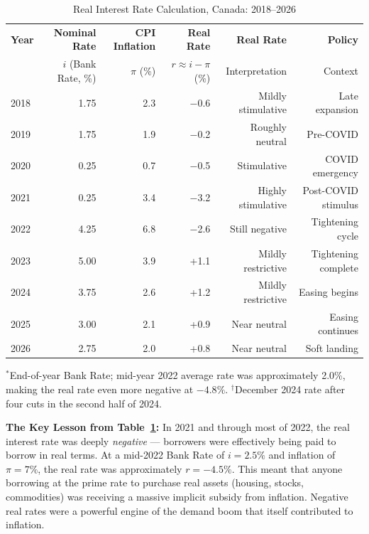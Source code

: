 \begin{table}[H]
\centering
\caption{Real Interest Rate Calculation, Canada: 2018--2026}
\label{tab:real_rates}
\renewcommand{\arraystretch}{1.30}
\begin{tabular}{lrrrrr}
\toprule
\textbf{Year} & \textbf{Nominal Rate} & \textbf{CPI Inflation} & \textbf{Real Rate}
              & \textbf{Real Rate} & \textbf{Policy} \\
              & $i$ (Bank Rate, \%) & $\pi$ (\%) & $r \approx i - \pi$ (\%)
              & Interpretation & Context \\
\midrule
2018 & 1.75 & 2.3 & $-$0.6 & Mildly stimulative & Late expansion \\
2019 & 1.75 & 1.9 & $-$0.2 & Roughly neutral    & Pre-COVID \\
2020 & 0.25 & 0.7 & $-$0.5 & Stimulative        & COVID emergency \\
2021 & 0.25 & 3.4 & $-$3.2 & Highly stimulative & Post-COVID stimulus \\
2022 & 4.25\rlap{$^*$} & 6.8 & $-$2.6\rlap{$^*$} & Still negative & Tightening cycle \\
2023 & 5.00 & 3.9 & +1.1   & Mildly restrictive & Tightening complete \\
2024 & 3.75\rlap{$^\dagger$} & 2.6 & +1.2 & Mildly restrictive & Easing begins \\
2025 & 3.00 & 2.1 & +0.9   & Near neutral       & Easing continues \\
2026 & 2.75 & 2.0 & +0.8   & Near neutral       & Soft landing \\
\bottomrule
\end{tabular}
\vspace{4pt}
\noindent\footnotesize{$^*$End-of-year Bank Rate; mid-year 2022 average rate was
approximately 2.0\%, making the real rate even more negative at $-4.8\%$.
$^\dagger$December 2024 rate after four cuts in the second half of 2024.}
\end{table}

\noindent\textbf{The Key Lesson from Table~\ref{tab:real_rates}:}
In 2021 and through most of 2022, the real interest rate was deeply
\textit{negative} --- borrowers were effectively being paid to borrow in
real terms. At a mid-2022 Bank Rate of $i = 2.5\%$ and inflation of
$\pi = 7\%$, the real rate was approximately $r = -4.5\%$. This meant
that anyone borrowing at the prime rate to purchase real assets (housing,
stocks, commodities) was receiving a massive implicit subsidy from
inflation. Negative real rates were a powerful engine of the demand boom
that itself contributed to inflation.

